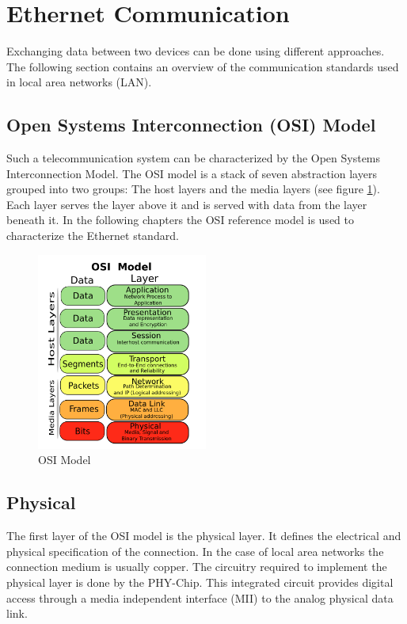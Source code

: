 %
%
\section{Ethernet Communication} \label{chapt:theory:ethernet}
Exchanging data between two devices can be done using different approaches. The
following section contains an overview of the communication standards used in
local area networks (LAN).


\subsection{Open Systems Interconnection (OSI) Model}
Such a telecommunication system can be characterized by the Open Systems 
Interconnection Model. The OSI model is a stack of seven abstraction layers 
grouped into two groups: The host layers and the media layers (see figure \ref{fig:osi}). 
Each layer serves the layer above it and is served with data from the layer
beneath it. In the following chapters the OSI reference model is used to
characterize the Ethernet standard.

\begin{figure}[tb!]
    \centering
    \includegraphics[width=0.5\textwidth]{images/theory/osi.png}
    \caption{OSI Model \cite{osi}}
    \label{fig:osi}
\end{figure}


\subsection{Physical} \label{chapt:theory:physical}
The first layer of the OSI model is the physical layer. It defines the electrical and physical specification of the connection. In the case of local
area networks the connection medium is usually copper. The circuitry required to implement the physical layer is done by the PHY-Chip. This integrated circuit provides digital access through a media independent interface (MII) to the analog physical data link.


